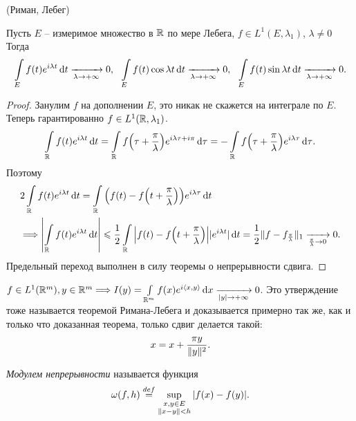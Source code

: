 \begin{theorem}(Риман, Лебег)
   
    Пусть $E$ -- измеримое множество в $\mathbb{R}$ по мере Лебега, $f \in L^1(E, \lambda_1)$,
    $\lambda \neq 0$ Тогда
    \[
        \int\limits_E{f(t) e^{i \lambda t} \,\mathrm{d} t} \xrightarrow[\lambda \to +\infty]{} 0,~~
        \int\limits_E{f(t) \cos{\lambda t} \,\mathrm{d} t} \xrightarrow[\lambda \to +\infty]{} 0,~~
        \int\limits_E{f(t) \sin{\lambda t} \,\mathrm{d} t} \xrightarrow[\lambda \to +\infty]{} 0
    .\]
\end{theorem}
\begin{proof}
    Занулим $f$ на дополнении $E$, это никак не скажется на интеграле по $E$.
    Теперь гарантированно $f \in L^1(\mathbb{R}, \lambda_1)$.
    \[
        \intl_\R{f(t) e^{i \lambda t} \dd t} = \intl_\R{f\parens*{\tau + \frac{\pi}{\lambda}}
        e^{i \lambda \tau + i \pi} \dd \tau} = -\intl_\R{f\parens*{\tau + \frac{\pi}{\lambda}} 
        e^{i \lambda \tau}\dd \tau}
    .\]
    Поэтому
    \begin{align*}
        &2 \intl_\R{f(t) e^{i \lambda t} \dd t} = \intl_\R{\parens*{f(t) -
        f\parens*{t + \frac{\pi}{\lambda}}} e^{i \lambda \tau} \dd t} \\
        &\Lra \abs*{\intl_\R{f(t) e^{i \lambda t} \dd t}} \leqslant
        \frac{1}{2} \intl_\R{\abs*{f(t) - f\parens*{t + \frac{\pi}{\lambda}}}
        |e^{i \lambda t}| \dd t} = \frac{1}{2} \norm{f - f_{\frac{\pi}{\lambda}}}_1 
        \xrightarrow[\frac{\pi}{\lambda} \to 0]{} 0
    .\end{align*}
    Предельный переход выполнен в силу теоремы о непрерывности сдвига.
\end{proof}

\begin{remark}\label{rhi_leb}
    $f \in L^1(\mathbb{R}^m), y \in \mathbb{R}^m \Longrightarrow I(y) = \int\limits_{\mathbb{R}^m}{f(x) e^{i \langle x, y \rangle} \,\mathrm{d} x}
    \xrightarrow[|y| \to +\infty]{} 0$. Это утверждение тоже называется теоремой
    Римана-Лебега и доказывается примерно так же, как и только что доказанная
    теорема, только сдвиг делается такой:
    \[
        x = x + \frac{\pi y}{\lVert y\rVert^2} 
    .\]
\end{remark}

\begin{definition}
    \textit{Модулем непрерывности} называется функция
    \[
        \omega(f, h) \overset{def}{\underset{}{=}} \sup_{\substack{x, y \in E \\ \lVert x - y\rVert < h}}{|f(x) - f(y)|}
    .\]
\end{definition}

